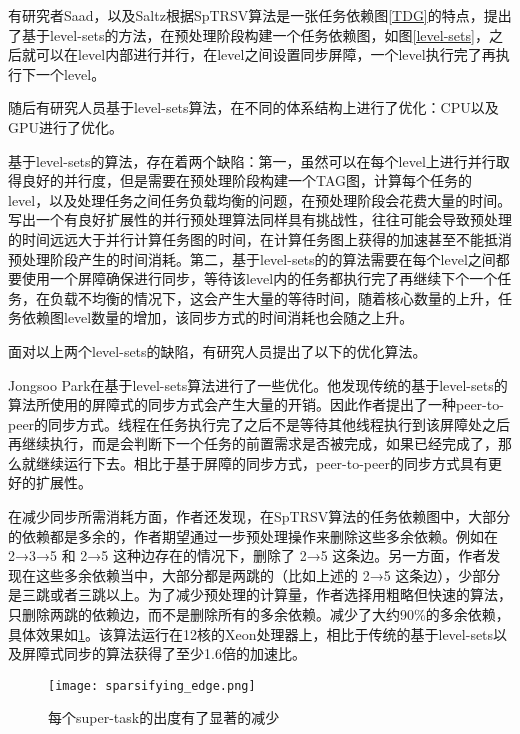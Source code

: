有研究者Saad\cite{anderson1989solving}，以及Saltz\cite{saltz1990aggregation}根据SpTRSV算法是一张任务依赖图\ref{TDG}的特点，提出了基于level-sets的方法，在预处理阶段构建一个任务依赖图，如图\ref{level-sets}，之后就可以在level内部进行并行，在level之间设置同步屏障，一个level执行完了再执行下一个level。

随后有研究人员基于level-sets算法，在不同的体系结构上进行了优化：CPU\cite{kabir2015sts}\cite{park2014sparsifying}\cite{Schreiber1982}\cite{wolf2010factors}以及GPU\cite{li2013gpu}\cite{naumov2011parallel}\cite{suchoski2012adapting}进行了优化。

基于level-sets的算法，存在着两个缺陷：第一，虽然可以在每个level上进行并行取得良好的并行度，但是需要在预处理阶段构建一个TAG图，计算每个任务的level，以及处理任务之间任务负载均衡的问题，在预处理阶段会花费大量的时间。写出一个有良好扩展性的并行预处理算法同样具有挑战性，往往可能会导致预处理的时间远远大于并行计算任务图的时间，在计算任务图上获得的加速甚至不能抵消预处理阶段产生的时间消耗。第二，基于level-sets的的算法需要在每个level之间都要使用一个屏障确保进行同步，等待该level内的任务都执行完了再继续下个一个任务，在负载不均衡的情况下，这会产生大量的等待时间，随着核心数量的上升，任务依赖图level数量的增加，该同步方式的时间消耗也会随之上升。

面对以上两个level-sets的缺陷，有研究人员提出了以下的优化算法。

Jongsoo Park\cite{park2014sparsifying}在基于level-sets算法进行了一些优化。他发现传统的基于level-sets的算法所使用的屏障式的同步方式会产生大量的开销。因此作者提出了一种peer-to-peer的同步方式。线程在任务执行完了之后不是等待其他线程执行到该屏障处之后再继续执行，而是会判断下一个任务的前置需求是否被完成，如果已经完成了，那么就继续运行下去。相比于基于屏障的同步方式，peer-to-peer的同步方式具有更好的扩展性。

在减少同步所需消耗方面，作者还发现，在SpTRSV算法的任务依赖图中，大部分的依赖都是多余的，作者期望通过一步预处理操作来删除这些多余依赖。例如在 2→3→5 和 2→5 这种边存在的情况下，删除了 2→5 这条边。另一方面，作者发现在这些多余依赖当中，大部分都是两跳的（比如上述的 2→5 这条边），少部分是三跳或者三跳以上。为了减少预处理的计算量，作者选择用粗略但快速的算法，只删除两跳的依赖边，而不是删除所有的多余依赖。减少了大约90\%的多余依赖，具体效果如\ref{sparsifying_edge}。该算法运行在12核的Xeon处理器上，相比于传统的基于level-sets以及屏障式同步的算法获得了至少1.6倍的加速比。

\begin{figure}[htbp]
    \centering
    \texttt{[image: sparsifying\_edge.png]}
    \caption{每个super-task的出度有了显著的减少}
    \label{sparsifying_edge}
\end{figure}

